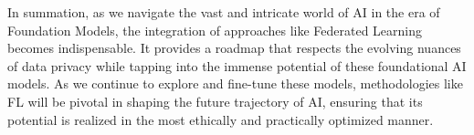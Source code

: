 \documentclass[withindex,glossary,firstyr]{cam-thesis}
\begin{document}
In summation, as we navigate the vast and intricate world of AI in the era of Foundation Models, the integration of approaches like Federated Learning becomes indispensable. It provides a roadmap that respects the evolving nuances of data privacy while tapping into the immense potential of these foundational AI models. As we continue to explore and fine-tune these models, methodologies like FL will be pivotal in shaping the future trajectory of AI, ensuring that its potential is realized in the most ethically and practically optimized manner.






\end{document}
